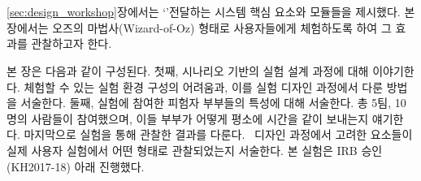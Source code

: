 \chapter{\expUser}
\label{sec:userstudy}

\ref{sec:design_workshop}장에서는  `\concept'\를 전달하는 시스템  핵심 요소와 모듈들을 제시했다. 본 장에서는 \sysname\을 오즈의 마법사(Wizard-of-Oz) 형태로 사용자들에게 체험하도록 하여 그 효과를 관찰하고자 한다.

본 장은 다음과 같이 구성된다. 첫째, 시나리오 기반의 실험 설계 과정에 대해 이야기한다. \concept\를 체험할 수 있는 실험 환경 구성의 어려움과, 이를 실험 디자인 과정에서 다룬 방법을 서술한다. 둘째, 실험에 참여한 피험자 부부들의 특성에 대해 서술한다. 총 5팀, 10명의 사람들이 참여했으며, 이들 부부가 어떻게 평소에 시간을 같이 보내는지 얘기한다. 마지막으로 실험을 통해 관찰한 결과를 다룬다. \sysname\ 디자인 과정에서 고려한 요소들이 실제 사용자 실험에서 어떤 형태로 관찰되었는지 서술한다. 본 실험은 IRB 승인(KH2017-18) 아래 진행했다.


